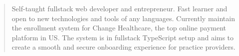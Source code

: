\documentclass[10pt,a4paper,ragged2e,withhyper]{altacv}
\begin{document}
\begin{paracol}{2}
        
        
        \newpage
        
        \switchcolumn
        
            \begin{quote}
                Self-taught fullstack web developer and entrepreneur. Fast learner and open to new technologies and tools of any languages. Currently maintain the enrollment system for Change Healthcare, the top online payment platform in US. The system is in fullstack TypeScript setup and aims to create a smooth and secure onboarding experience for practice providers.
            \end{quote}
        

\end{paracol}
\end{document}
